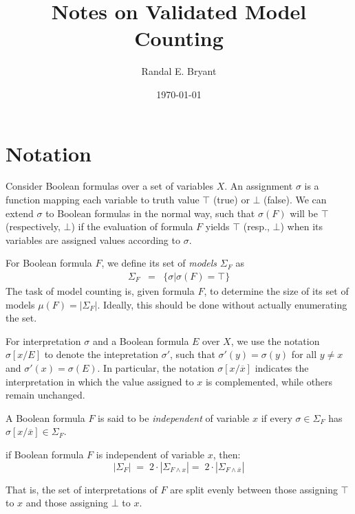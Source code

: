 \documentclass{llncs}
\title{Notes on Validated Model Counting}
\author{Randal E. Bryant}
\institute{
Computer Science Department \\
Carnegie Mellon University, Pittsburgh, PA, United States
}
\date{\today}
\newcommand{\tautology}{\top}
\newcommand{\nil}{\bot}
\newcommand{\obar}[1]{\overline{#1}}
\newcommand{\interp}{\sigma}
\newcommand{\interpset}[1]{\Sigma_{#1}}
\newcommand{\mcount}{\mu}
\newcommand{\subs}[2]{[#1/#2]}
\newcommand{\subsflip}[1]{\subs{#1}{\obar{#1}}}
\begin{document}
\maketitle

\section{Notation}

Consider Boolean formulas over a set of variables $X$.  An
assignment $\interp$ is a function mapping each variable to 
truth value $\tautology$ (true) or $\nil$ (false).  We can extend
$\interp$ to Boolean formulas in the normal way, such that
$\interp(F)$ will be $\tautology$ (respectively, $\nil$) if the
evaluation of formula $F$ yields $\tautology$ (resp., $\nil$) when its
variables are assigned values according to $\interp$.

For Boolean formula $F$, we define its set of {\em models} $\interpset{F}$ as
\begin{eqnarray}
\interpset{F} & = & \{ \interp | \interp(F) = \tautology \}
\end{eqnarray}
The task of model counting is, given formula $F$, to determine the size of its set of models
$\mcount(F) = |\interpset{F}|$.  Ideally, this should be done without actually enumerating the set.

For interpretation $\interp$ and a Boolean formula $E$ over $X$, we
use the notation $\interp\subs{x}{E}$ to denote the intepretation
$\interp'$, such that $\interp'(y) = \interp(y)$ for all $y \not = x$
and $\interp'(x) = \interp(E)$.  In particular, the notation
$\interp\subsflip{x}$ indicates the interpretation in which the value
assigned to $x$ is complemented, while others remain unchanged.

A Boolean formula $F$ is said to be {\em independent} of variable $x$
if every $\interp \in \interpset{F}$ has $\interp\subsflip{x} \in
\interpset{F}$.

\begin{lemma}
\label{lemma:independent:split}
if Boolean formula $F$ is independent of variable $x$, then:
\begin{equation}
|\interpset{F}| \; = \; 2\cdot |\interpset{F\land x}| = \; 2\cdot |\interpset{F\land \obar{x}}| \label{eqn:independent}
\end{equation}  
\end{lemma}  
That is, the set of interpretations of $F$ are split evenly between
those assigning $\tautology$ to $x$ and those assigning $\nil$ to $x$.
\end{document}
